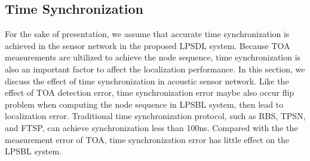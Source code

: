 \subsection{Time Synchronization }

For the sake of presentation, we assume that accurate time synchronization is achieved in the sensor network in the proposed LPSDL system.
Because TOA measurements are ultilized to achieve the node sequence, time synchronization is also an important factor to affect the localization performance. 
In this section, we discuss the effect of time synchronization in acoustic sensor network.
Like the effect of TOA detection error, time synchronization error maybe also occur flip problem when computing the node sequence in LPSBL system, then lead to localization error.
Traditional time synchronization protocol, such as RBS, TPSN, and FTSP, can achieve synchronization less than 100ns. 
Compared with the the measurement error of TOA, time synchronization error has little effect on the LPSBL system.






